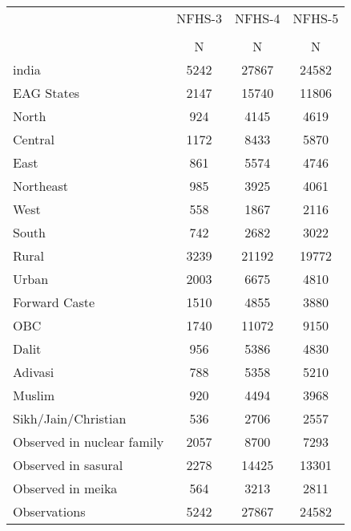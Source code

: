 {
\def\sym#1{\ifmmode^{#1}\else\(^{#1}\)\fi}
\begin{tabular}{l*{3}{c}}
\hline\hline
                    &      NFHS-3&      NFHS-4&      NFHS-5\\
                    &\multicolumn{1}{c}{}&\multicolumn{1}{c}{}&\multicolumn{1}{c}{}\\
                    &           N&           N&           N\\
\hline
india               &        5242&       27867&       24582\\
EAG States          &        2147&       15740&       11806\\
North               &         924&        4145&        4619\\
Central             &        1172&        8433&        5870\\
East                &         861&        5574&        4746\\
Northeast           &         985&        3925&        4061\\
West                &         558&        1867&        2116\\
South               &         742&        2682&        3022\\
Rural               &        3239&       21192&       19772\\
Urban               &        2003&        6675&        4810\\
Forward Caste       &        1510&        4855&        3880\\
OBC                 &        1740&       11072&        9150\\
Dalit               &         956&        5386&        4830\\
Adivasi             &         788&        5358&        5210\\
Muslim              &         920&        4494&        3968\\
Sikh/Jain/Christian &         536&        2706&        2557\\
Observed in nuclear family&        2057&        8700&        7293\\
Observed in sasural &        2278&       14425&       13301\\
Observed in meika   &         564&        3213&        2811\\
\hline
Observations        &        5242&       27867&       24582\\
\hline\hline
\end{tabular}
}
